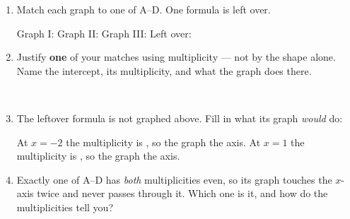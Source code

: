 \documentclass[10pt]{article}
\begin{document}
\boxguard
\begin{tcolorbox}[colback=white, colframe=black!40,
    title=\textbf{Tier A --- Approaching Proficiency},
    fonttitle=\bfseries, arc=2mm, left=3mm, right=3mm, top=2mm, bottom=2mm]

\begin{enumerate}[itemsep=8pt]
  \item Match each graph to one of A--D. One formula is left over.

        \smallskip
        Graph I: \blank{1.4cm} \qquad Graph II: \blank{1.4cm} \qquad
        Graph III: \blank{1.4cm} \qquad Left over: \blank{1.4cm}

  \item Justify \textbf{one} of your matches using multiplicity --- not by
        the shape alone. Name the intercept, its multiplicity, and what the
        graph does there.

        \vspace{0.05in}
        \writeline\\
        \writeline

  \item The leftover formula is not graphed above. Fill in what its graph
        \textit{would} do:

        \smallskip
        At $x = -2$ the multiplicity is \blank{1.2cm}, so the graph
        \blank{2.6cm} the axis. At $x = 1$ the multiplicity is
        \blank{1.2cm}, so the graph \blank{2.6cm} the axis.

  \item Exactly one of A--D has \textit{both} multiplicities even, so its
        graph touches the $x$-axis twice and never passes through it. Which
        one is it, and how do the multiplicities tell you?

        \vspace{0.05in}
        \writeline\\
        \writeline
\end{enumerate}
\end{tcolorbox}

\vspace{0.1in}
\end{document}
